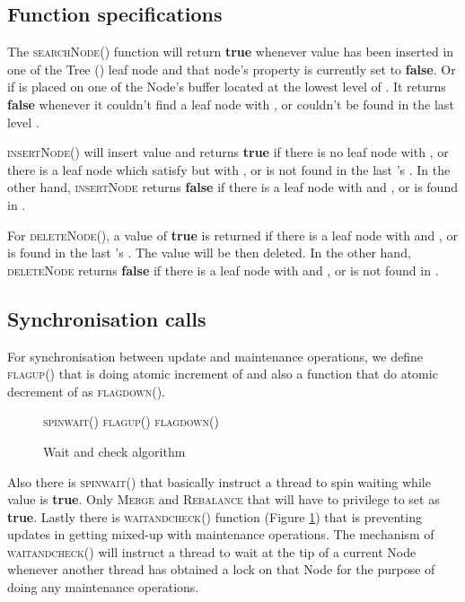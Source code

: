 


\subsection{Function specifications}
The \textsc{searchNode}() function will return \textbf{true} whenever value 
has been inserted in one of the Tree () leaf node and that node's 
property is currently set to \textbf{false}. Or if  is placed on one of the 
Node's buffer located at the lowest level of . It returns \textbf{false} whenever
it couldn't find a leaf node with , or  couldn't be found in 
the last level . 

\textsc{insertNode}() will insert value  and returns \textbf{true} 
if there is no leaf node with , or
there is a leaf node  which satisfy  but with , 
or  is not found in the last 's .
In the other hand, \textsc{insertNode} returns \textbf{false} if there is a leaf node with 
 and , or  is found in .

For \textsc{deleteNode}(), a value of \textbf{true} is returned if there
is a leaf node with  and , or  is found in the
last 's . The value  will be then deleted.
In the other hand, \textsc{deleteNode} returns \textbf{false} if there is a leaf
node with  and , or  is not found in
.


\subsection{Synchronisation calls}
For synchronisation between update and maintenance operations, we define
\textsc{flagup}() that is doing atomic increment of  and also
a function that do atomic decrement of  as
\textsc{flagdown}().

\begin{figure}[!t] \centering 
\begin{algorithmic}[1] 
\small
{}
    \Do
        \State \textsc{spinwait}() \label{lst:line:spinwait}
        \State \textsc{flagup}() 
        \State 
        \If{}
            \State \textsc{flagdown}() 
            \State 
        \EndIf
    \doWhile{}
\EndFunction
\end{algorithmic}
\caption{Wait and check algorithm}
\label{lst:waitandcheck}
\end{figure}

Also there is \textsc{spinwait}() that basically instruct a thread to
spin waiting while  value is \textbf{true}. Only \textsc{Merge} and 
\textsc{Rebalance} that will have to privilege to set  as \textbf{true}.
Lastly there is
\textsc{waitandcheck}() function (Figure
\ref{lst:waitandcheck}) that is preventing updates in getting mixed-up with maintenance
operations. The mechanism of \textsc{waitandcheck}()
will instruct a thread to wait at the tip of a current Node
whenever another thread has obtained a lock on that Node
for the purpose of doing any maintenance operations.

